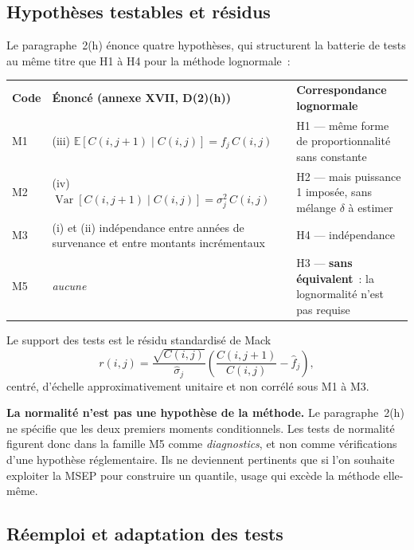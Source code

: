 \documentclass[a4paper,11pt]{article}
\begin{document}
\subsection{Hypothèses testables et résidus}

Le paragraphe~2(h) énonce quatre hypothèses, qui structurent la batterie de tests
au même titre que H1 à H4 pour la méthode lognormale~:

\begin{center}
\small
{}
\begin{tabular}{@{}p{1.5cm}p{6.6cm}p{6.7cm}@{}}
\rowcolor{tableheader}
\textcolor{financeblue}{\textbf{Code}} &
\textcolor{financeblue}{\textbf{Énoncé (annexe XVII, D(2)(h))}} &
\textcolor{financeblue}{\textbf{Correspondance lognormale}} \\
M1 & (iii) $\mathbb{E}[C(i,j+1)\mid C(i,j)] = f_j\,C(i,j)$ &
H1 --- même forme de proportionnalité sans constante \\
M2 & (iv) $\operatorname{Var}[C(i,j+1)\mid C(i,j)] = \sigma_j^2\,C(i,j)$ &
H2 --- mais puissance 1 imposée, sans mélange $\delta$ à estimer \\
M3 & (i) et (ii) indépendance entre années de survenance et entre montants
incrémentaux & H4 --- indépendance \\
M5 & \emph{aucune} & H3 --- \textbf{sans équivalent}~: la lognormalité n'est
pas requise \\
\end{tabular}
\end{center}

Le support des tests est le résidu standardisé de Mack
\[
  r(i,j) = \frac{\sqrt{C(i,j)}}{\hat\sigma_j}
  \left(\frac{C(i,j+1)}{C(i,j)} - \hat f_j\right),
\]
centré, d'échelle approximativement unitaire et non corrélé sous M1 à M3.

\begin{encadre}
\textbf{La normalité n'est pas une hypothèse de la méthode.} Le paragraphe~2(h)
ne spécifie que les deux premiers moments conditionnels. Les tests de normalité
figurent donc dans la famille M5 comme \emph{diagnostics}, et non comme
vérifications d'une hypothèse réglementaire. Ils ne deviennent pertinents que si
l'on souhaite exploiter la MSEP pour construire un quantile, usage qui excède la
méthode elle-même.
\end{encadre}

\subsection{Réemploi et adaptation des tests}
\end{document}

